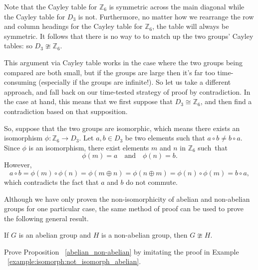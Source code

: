 \begin{example}
\begin{table}[H]
{\begin{center}
\begin{tabular}{c|cccccccc}
\end{tabular}
\end{center}
}
\end{table}

Note that the Cayley table for ${\mathbb Z}_6$ is symmetric across the main diagonal while the Cayley table for $D_3$ is not.  Furthermore, no matter how we rearrange the row and column headings for the Cayley table for ${\mathbb Z}_6$, the  table will always be symmetric. It follows that there is no way to to match up the two groups' Cayley tables: so $D_3 \ncong {\mathbb Z}_6$.

This  argument via Cayley table works in the case where the two groups being compared are both small, but if the groups are large then it's far too time-consuming (especially if the groups are infinite!). So let us take a different approach, and fall back on our time-tested strategy of proof by contradiction. In the case at hand, this means that we first suppose that $D_3 \cong {\mathbb Z}_6$, and  then find a contradiction based on that supposition. 

So, suppose that the two groups are isomorphic, which means there exists an isomorphism $\phi : {\mathbb Z}_6 \rightarrow  D_3$.  Let $a , b \in D_3$ be two elements such that $a\circ b \neq b \circ a$.  Since $\phi$ is an isomorphism, there exist elements $m$ and $n$ in ${\mathbb Z}_6$ such~that 
\[
\phi( m )  = a \quad \text{and} \quad
\phi( n )  = b.
\]
However,
\[
a\circ b = \phi(m ) \circ  \phi(n) = \phi(m \oplus  n) = \phi(n \oplus m) = \phi(n ) \circ \phi(m) = b \circ a,
\]
which contradicts the fact that $a$ and $b$ do not commute.
\end{example}

Although we have only proven the non-isomorphicity of abelian and non-abelian groups for one particular case, the same  method of proof can be used to prove the following general result.

\begin{thm}\label{abelian_non-abelian}
If $G$ is an abelian group and $H$ is a non-abelian group, then $G \ncong H$.
\end{thm}

\begin{exercise}
Prove Proposition ~\ref{abelian_non-abelian} by imitating the proof in Example ~\ref{example:isomorph:not_isomorph_abelian}.
\end{exercise}

